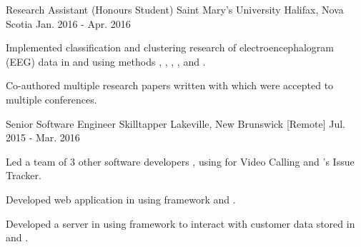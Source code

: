 \begin{cventries}
  \cventry
    {Research Assistant (Honours Student)} %
    {Saint Mary's University} %
    {Halifax, Nova Scotia} %
    {Jan. 2016 - Apr. 2016} %
    {
      \begin{cvitems} %
        \item {Implemented classification and clustering research of electroencephalogram (EEG) data in  and  using methods , , , , and .}
        \item {Co-authored multiple research papers written with  which were accepted to multiple conferences.}
      \end{cvitems}
    }

  \cventry
    {Senior Software Engineer} %
    {Skilltapper} %
    {Lakeville, New Brunswick [Remote]} %
    {Jul. 2015 - Mar. 2016} %
    {
      \begin{cvitems} %
        \item {Led a team of 3 other software developers , using  for Video Calling and 's Issue Tracker.}
        \item {Developed web application in  using  framework and .}
        \item {Developed a  server in  using  framework to interact with customer data stored in  and .}
      \end{cvitems}
    }


\end{cventries}
